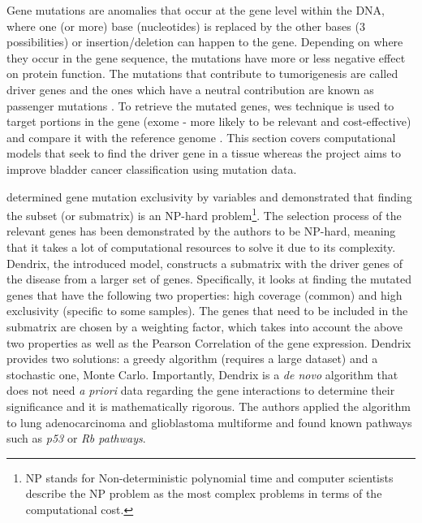 Gene mutations are anomalies that occur at the gene level within the DNA, where one (or more) base (nucleotides) is replaced by the other bases (3 possibilities) or insertion/deletion can happen to the gene. Depending on where they occur in the gene sequence, the mutations have more or less negative effect on protein function. The mutations that contribute to tumorigenesis are called driver genes and the ones which have a neutral contribution are known as passenger mutations \citep{Ciriello2012-hi}. To retrieve the mutated genes, \acrlong{wes} technique is used to target portions in the gene (exome - more likely to be relevant and cost-effective) and compare it with the reference genome \citep{Schneider2016-ml}. This section covers computational models that seek to find the driver gene in a tissue whereas the project aims to improve bladder cancer classification using mutation data. 

\citet{Vandin2012-cf} determined gene mutation exclusivity by variables and demonstrated that finding the subset (or submatrix) is an NP-hard problem\footnote{NP stands for Non-deterministic polynomial time and computer scientists describe the NP problem as the most complex problems in terms of the computational cost.}. The selection process of the relevant genes has been demonstrated by the authors to be NP-hard, meaning that it takes a lot of computational resources to solve it due to its complexity. Dendrix, the introduced model, constructs a submatrix with the driver genes of the disease from a larger set of genes. Specifically, it looks at finding the mutated genes that have the following two properties: high coverage (common) and high exclusivity (specific to some samples). The genes that need to be included in the submatrix are chosen by a weighting factor, which takes into account the above two properties as well as the Pearson Correlation of the gene expression. Dendrix provides two solutions: a greedy algorithm (requires a large dataset) and a stochastic one, Monte Carlo. Importantly, Dendrix is a \textit{de novo} algorithm that does not need \textit{a priori} data regarding the gene interactions to determine their significance and it is mathematically rigorous. The authors applied the algorithm to lung adenocarcinoma and glioblastoma multiforme and found known pathways such as \textit{p53} or \textit{Rb pathways}.


